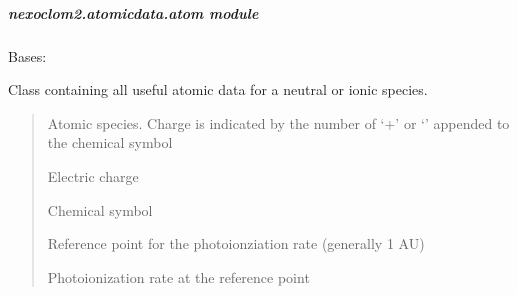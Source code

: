 \documentclass[letterpaper,10pt,english]{sphinxmanual}
\begin{document}
\subparagraph{nexoclom2.atomicdata.atom module}
\label{\detokenize{nexoclom2/nexoclom2.atomicdata.atom:module-nexoclom2.atomicdata.atom}}\label{\detokenize{nexoclom2/nexoclom2.atomicdata.atom:nexoclom2-atomicdata-atom-module}}\label{\detokenize{nexoclom2/nexoclom2.atomicdata.atom::doc}}

\begin{fulllineitems}
\label{\detokenize{nexoclom2/nexoclom2.atomicdata.atom:nexoclom2.atomicdata.atom.Atom}}
\pysigstartsignatures
\pysiglinewithargsret
{}
{}
{}
\pysigstopsignatures
\sphinxAtStartPar
Bases: 

\sphinxAtStartPar
Class containing all useful atomic data for a neutral or ionic species.
\begin{quote}\begin{description}
\begin{description}
\sphinxAtStartPar
Atomic species. Charge is indicated by the number of ‘+’ or ‘\sphinxhyphen{}’
appended to the chemical symbol

\end{description}

\begin{description}
\sphinxAtStartPar
Electric charge

\sphinxAtStartPar
Chemical symbol

\sphinxAtStartPar
Reference point for the photoionziation rate (generally 1 AU)

\sphinxAtStartPar
Photoionization rate at the reference point


\end{description}
\end{description}
\end{quote}
\end{fulllineitems}
\end{document}
